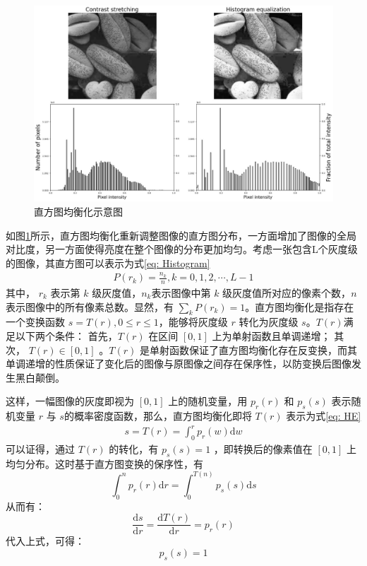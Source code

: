 \documentclass[a4paper]{ctexart}
\begin{document}
	\begin{figure}[htb]
		\centering 
		\includegraphics[width=\columnwidth]{picture/LLIE/HE/Histogram equalization}
		\caption{
			\label{fig: Histogram equalization} 
			直方图均衡化示意图
		}
	\end{figure}
	
	如图\ref{fig: Histogram equalization}所示，直方图均衡化重新调整图像的直方图分布，一方面增加了图像的全局对比度，另一方面使得亮度在整个图像的分布更加均匀。考虑一张包含L个灰度级的图像，其直方图可以表示为式\ref{eq: Histogram}
	\begin{equation}
		\begin{aligned}
			P(r_k) = \frac{n_k}{n}, k=0, 1, 2, \cdots, L-1
		\end{aligned}
		\label{eq: Histogram}
	\end{equation}
	其中， $r_k$ 表示第 $k$ 级灰度值，$n_k$表示图像中第 $k$ 级灰度值所对应的像素个数，$n$ 表示图像中的所有像素总数。显然，有 $\sum_{k} P(r_k)=1$。直方图均衡化是指存在一个变换函数 $s=T(r), 0 \leqslant r \leqslant 1$，能够将灰度级 $r$ 转化为灰度级 $s$。$T(r)$满足以下两个条件： 首先，$T(r)$ 在区间 $[0, 1]$ 上为单射函数且单调递增； 其次， $T(r) \in [0, 1]$ 。$T(r)$ 是单射函数保证了直方图均衡化存在反变换，而其单调递增的性质保证了变化后的图像与原图像之间存在保序性，以防变换后图像发生黑白颠倒。
	
	这样，一幅图像的灰度即视为 $[0,1]$ 上的随机变量，用 $p_r(r)$ 和 $p_s(s)$ 表示随机变量 $r$ 与 $s$的概率密度函数，那么，直方图均衡化即将 $T(r)$ 表示为式\ref{eq: HE}
	\begin{equation}
		\begin{aligned}
			s = T(r) = \int_{0}^{r} p_r(w) \mathrm{d}w
		\end{aligned}
		\label{eq: HE}
	\end{equation}
	可以证得，通过 $T(r)$ 的转化，有 $p_s(s) = 1$ ，即转换后的像素值在 $[0, 1]$ 上均匀分布。这时基于直方图变换的保序性，有 $$\int_{0}^{n} p_r(r) \mathrm{d}r = \int_{0}^{T(n)} p_s(s) \mathrm{d}s$$ 从而有： $$\frac{\mathrm{d}s}{\mathrm{d}r} = \frac{\mathrm{d}T(r)}{\mathrm{d}r} = p_r(r)$$ 代入上式，可得： $$p_s(s) = 1$$ 
	
\end{document}
